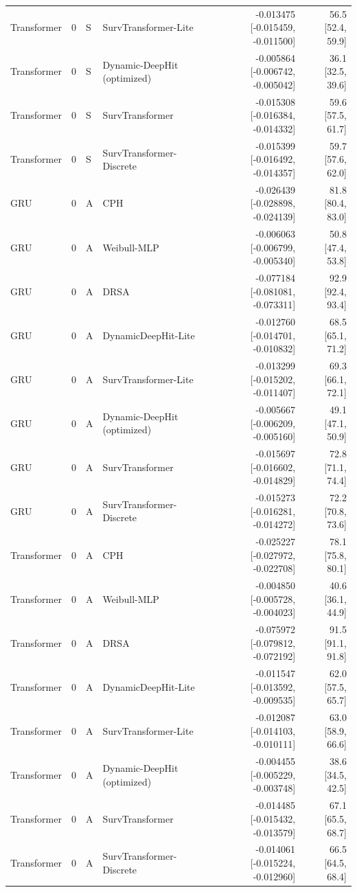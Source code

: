 \begin{longtable}{lll p{3.0cm} rr}
Transformer & 0 & S & SurvTransformer-Lite & -0.013475 [-0.015459, -0.011500] & 56.5 [52.4, 59.9]\\
Transformer & 0 & S & Dynamic-DeepHit (optimized) & -0.005864 [-0.006742, -0.005042] & 36.1 [32.5, 39.6]\\
Transformer & 0 & S & SurvTransformer & -0.015308 [-0.016384, -0.014332] & 59.6 [57.5, 61.7]\\
Transformer & 0 & S & SurvTransformer-Discrete & -0.015399 [-0.016492, -0.014357] & 59.7 [57.6, 62.0]\\
GRU & 0 & A & CPH & -0.026439 [-0.028898, -0.024139] & 81.8 [80.4, 83.0]\\
GRU & 0 & A & Weibull-MLP & -0.006063 [-0.006799, -0.005340] & 50.8 [47.4, 53.8]\\
GRU & 0 & A & DRSA & -0.077184 [-0.081081, -0.073311] & 92.9 [92.4, 93.4]\\
GRU & 0 & A & DynamicDeepHit-Lite & -0.012760 [-0.014701, -0.010832] & 68.5 [65.1, 71.2]\\
GRU & 0 & A & SurvTransformer-Lite & -0.013299 [-0.015202, -0.011407] & 69.3 [66.1, 72.1]\\
GRU & 0 & A & Dynamic-DeepHit (optimized) & -0.005667 [-0.006209, -0.005160] & 49.1 [47.1, 50.9]\\
GRU & 0 & A & SurvTransformer & -0.015697 [-0.016602, -0.014829] & 72.8 [71.1, 74.4]\\
GRU & 0 & A & SurvTransformer-Discrete & -0.015273 [-0.016281, -0.014272] & 72.2 [70.8, 73.6]\\
Transformer & 0 & A & CPH & -0.025227 [-0.027972, -0.022708] & 78.1 [75.8, 80.1]\\
Transformer & 0 & A & Weibull-MLP & -0.004850 [-0.005728, -0.004023] & 40.6 [36.1, 44.9]\\
Transformer & 0 & A & DRSA & -0.075972 [-0.079812, -0.072192] & 91.5 [91.1, 91.8]\\
Transformer & 0 & A & DynamicDeepHit-Lite & -0.011547 [-0.013592, -0.009535] & 62.0 [57.5, 65.7]\\
Transformer & 0 & A & SurvTransformer-Lite & -0.012087 [-0.014103, -0.010111] & 63.0 [58.9, 66.6]\\
Transformer & 0 & A & Dynamic-DeepHit (optimized) & -0.004455 [-0.005229, -0.003748] & 38.6 [34.5, 42.5]\\
Transformer & 0 & A & SurvTransformer & -0.014485 [-0.015432, -0.013579] & 67.1 [65.5, 68.7]\\
Transformer & 0 & A & SurvTransformer-Discrete & -0.014061 [-0.015224, -0.012960] & 66.5 [64.5, 68.4]\\

\end{longtable}
